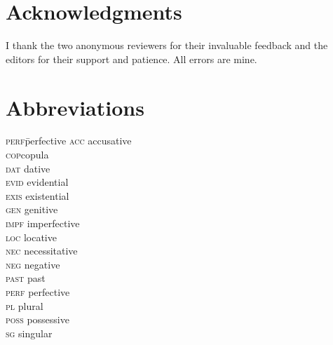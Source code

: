 \documentclass[output=paper]{langsci/langscibook}
\begin{document}
\section*{Acknowledgments}

I thank the two anonymous reviewers for their invaluable feedback and the editors for their support and patience. 
All errors are mine.

\section*{Abbreviations}
\begin{multicols}{3}
\begin{tabbing}
\textsc{perf}\hspace{1ex}\= perfective\kill
\textsc{acc}\> accusative\\ 
\textsc{cop}\>copula\\ 
\textsc{dat}\> dative\\ 
\textsc{evid}\> evidential\\ 
\textsc{exis}\> existential\\
\textsc{gen}\> genitive\\ 
\textsc{impf}\> imperfective\\ 
\textsc{loc}\> locative\\ 
\textsc{nec}\> necessitative\\ 
\textsc{neg}\> negative\\ 
\textsc{past}\> past\\ 
\textsc{perf}\> perfective\\ 
\textsc{pl}\> plural\\ 
\textsc{poss}\> possessive\\ 
\textsc{sg}\> singular\\
\end{tabbing}
\end{multicols}

{\sloppy\printbibliography[heading=subbibliography,notkeyword=this]}
\end{document}
